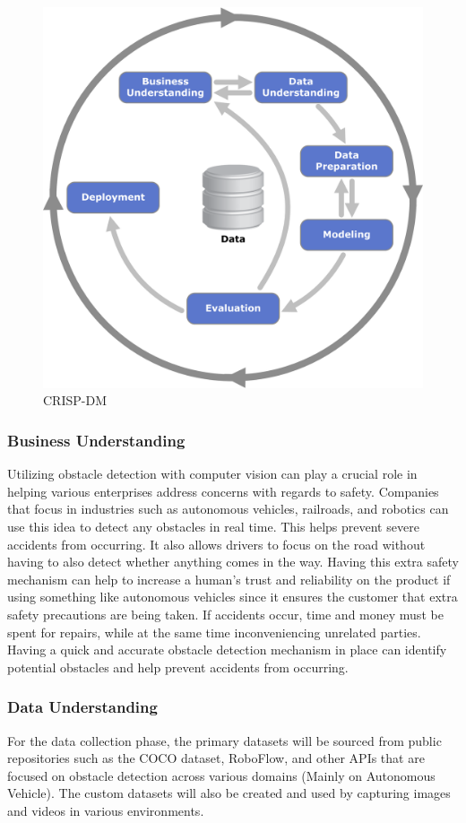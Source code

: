 \documentclass[stu,12pt,floatsintext]{apa7}
\begin{document}
\begin{figure}[!htb]
    \centering
    \includegraphics[width=0.5\linewidth]{./images/CRISP-DM.png}
    \caption{CRISP-DM}
    \label{fig:crispdm}
\end{figure}

\subsubsection{Business Understanding}
Utilizing obstacle detection with computer vision can play a crucial role in helping various enterprises address concerns with regards to safety. Companies that focus in industries such as autonomous vehicles, railroads, and robotics can use this idea to detect any obstacles in real time. This helps prevent severe accidents from occurring. It also allows drivers to focus on the road without having to also detect whether anything comes in the way. Having this extra safety mechanism can help to increase a human's trust and reliability on the product if using something like autonomous vehicles since it ensures the customer that extra safety precautions are being taken. If accidents occur, time and money must be spent for repairs, while at the same time inconveniencing unrelated parties. Having a quick and accurate obstacle detection mechanism in place can identify potential obstacles and help prevent accidents from occurring.


\subsubsection{Data Understanding}
For the data collection phase, the primary datasets will be sourced from public repositories such as the COCO dataset, RoboFlow, and other APIs that are focused on obstacle detection across various domains (Mainly on Autonomous Vehicle). The custom datasets will also be created and used by capturing images and videos in various environments. 
\end{document}
